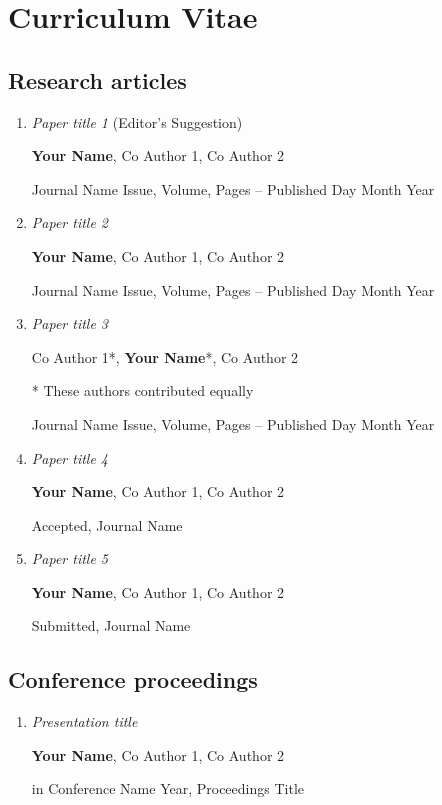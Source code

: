 \chapter*{Curriculum Vitae}

\section*{Research articles}
\begin{enumerate}
    \item \textit{Paper title 1} (Editor’s Suggestion)
    
    \textbf{\textbf{Your Name}}, Co Author 1, Co Author 2
    
    Journal Name Issue, Volume, Pages – Published Day Month Year


    \item \textit{Paper title 2}
    
    \textbf{\textbf{Your Name}}, Co Author 1, Co Author 2
    
    Journal Name Issue, Volume, Pages – Published Day Month Year


    \item \textit{Paper title 3}
    
    Co Author 1*, \textbf{\textbf{Your Name}}*, Co Author 2

    * These authors contributed equally
    
    Journal Name Issue, Volume, Pages – Published Day Month Year


    \item \textit{Paper title 4}
    
    \textbf{\textbf{Your Name}}, Co Author 1, Co Author 2
    
    Accepted, Journal Name

    \item \textit{Paper title 5}
    
    \textbf{\textbf{Your Name}}, Co Author 1, Co Author 2
    
    Submitted, Journal Name

\end{enumerate}

\section*{Conference proceedings}
\begin{enumerate}

    \item \textit{Presentation title}
    
    \textbf{\textbf{Your Name}}, Co Author 1, Co Author 2
    
    in Conference Name Year, Proceedings Title

\end{enumerate}

